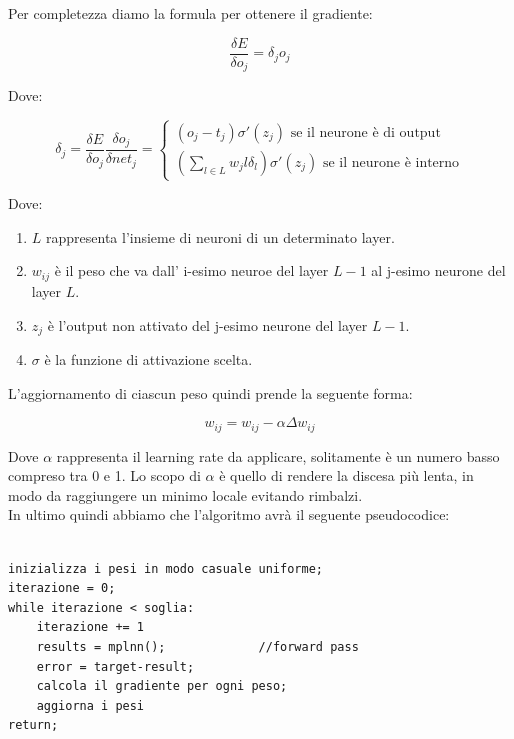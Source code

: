 \documentclass[12pt]{article}
\begin{document}
Per completezza diamo la formula per ottenere il gradiente:

\begin{equation}
\frac{\delta E}{\delta o_j} = \delta_j o_j
\end{equation}

Dove:

\begin{equation}
    \delta_j = \frac{\delta E}{\delta o_j}\frac{\delta o_j}{\delta net_j} = 
    \begin{cases} 
        (o_j - t_j)\sigma'(z_j)\text{  se il neurone è di output}\\
        (\sum_{l \in L} w_jl\delta_l)\sigma'(z_j)\text{  se il neurone è interno}
    \end{cases}
\end{equation}

Dove:

\begin{enumerate}
    \item $L$ rappresenta l'insieme di neuroni di un determinato layer.
    \item $w_{ij}$ è il peso che va dall' i-esimo neuroe del layer $L-1$ al
    j-esimo neurone del layer $L$.
    \item $z_j$ è l'output non attivato del j-esimo neurone del layer $L-1$.
    \item $\sigma$ è la funzione di attivazione scelta.
\end{enumerate}

L'aggiornamento di ciascun peso quindi prende la seguente forma:

\begin{equation}
w_{ij} = w_{ij} - \alpha\Delta w_{ij}
\end{equation}

Dove $\alpha$ rappresenta il learning rate da applicare,
solitamente è un numero basso compreso tra 0 e 1.
Lo scopo di $\alpha$ è quello di rendere la discesa più lenta, in modo da 
raggiungere un minimo locale evitando rimbalzi.\\
In ultimo quindi abbiamo che l'algoritmo avrà il seguente pseudocodice:

\begin{lstlisting}

inizializza i pesi in modo casuale uniforme;
iterazione = 0;
while iterazione < soglia:
    iterazione += 1
    results = mplnn();             //forward pass
    error = target-result;
    calcola il gradiente per ogni peso;
    aggiorna i pesi
return;

\end{lstlisting}
\end{document}
